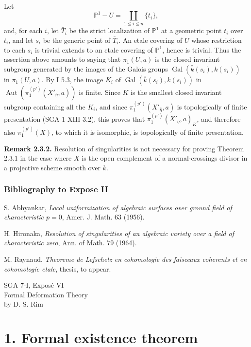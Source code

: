 \documentclass[11pt]{article}
\providecommand{\Gal}{\operatorname{Gal}}
\providecommand{\Aut}{\operatorname{Aut}}
\begin{document}
Let
\[
 \mathbb P^1-U=\coprod_{1\le i\le n}\{t_i\},
\]
and, for each $i$, let $\bar T_i$ be the strict localization of $\mathbb P^1$ at a geometric point $\bar t_i$ over $t_i$, and let $s_i$ be the generic point of $\bar T_i$. An etale covering of $U$ whose restriction to each $s_i$ is trivial extends to an etale covering of $\mathbb P^1$, hence is trivial. Thus the assertion above amounts to saying that $\pi_1(U,a)$ is the closed invariant subgroup generated by the images of the Galois groups $\Gal(\bar k(s_i),k(s_i))$ in $\pi_1(U,a)$. By I 5.3, the image $K_i$ of $\Gal(\bar k(s_i),k(s_i))$ in $\Aut(\pi_1^{(p')}(X'_{\bar\eta},a))$ is finite. Since $K$ is the smallest closed invariant subgroup containing all the $K_i$, and since $\pi_1^{(p')}(X'_{\bar\eta},a)$ is topologically of finite presentation (SGA 1 XIII 3.2), this proves that $\pi_1^{(p')}(X'_{\bar\eta},a)_K$, and therefore also $\pi_1^{(p')}(X)$, to which it is isomorphic, is topologically of finite presentation.

\textbf{Remark 2.3.2.} Resolution of singularities is not necessary for proving Theorem 2.3.1 in the case where $X$ is the open complement of a normal-crossings divisor in a projective scheme smooth over $k$.

\subsubsection*{Bibliography to Expose II}
\begin{enumerate}[label={[\arabic*]}]
\item S. Abhyankar, \emph{Local uniformization of algebraic surfaces over ground field of characteristic $p=0$}, Amer. J. Math. 63 (1956).
\item H. Hironaka, \emph{Resolution of singularities of an algebraic variety over a field of characteristic zero}, Ann. of Math. 79 (1964).
\item M. Raynaud, \emph{Theoreme de Lefschetz en cohomologie des faisceaux coherents et en cohomologie etale}, thesis, to appear.
\end{enumerate}



\begin{center}
{\Large SGA 7-I, Expos\'e VI}\\[0.4em]
{\large Formal Deformation Theory}\\[0.4em]
by D. S. Rim
\end{center}

\section*{1. Formal existence theorem}
\end{document}
